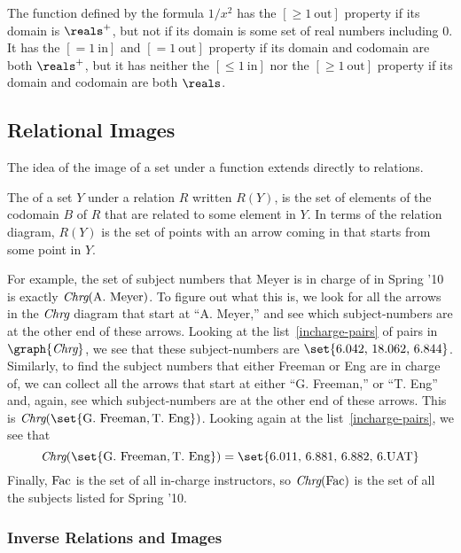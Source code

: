 \begin{example}
  The function defined by the formula $1/x^2$ has the $[\ge 1\
  \text{out}]$ property if its domain is $\reals^+$, but not if its domain
  is some set of real numbers including 0.  It has the $[=1\ \text{in}]$
  and $[=1\ \text{out}]$ property if its domain and codomain are both
  $\reals^+$, but it has neither the $[\le 1\ \text{in}]$ nor the $[\ge 1\
  \text{out}]$ property if its domain and codomain are both $\reals$.
\end{example}

\subsection{Relational Images}
The idea of the image of a set under a function extends directly to
relations.

\begin{definition}
  The %
 of a set $Y$ under a relation $R$ written $R(Y)$,
  is the set of elements of the codomain $B$ of $R$ that are related to
  some element in $Y$.  In terms of the relation diagram, $R(Y)$ is the
  set of points with an arrow coming in that starts from some point in $Y$.
\iffalse
, namely,
\[
R(Y) \eqdef \set{b \in B \suchthat yRb \text{ for some } y \in Y}.
\]\fi
\end{definition}

For example, the set of subject numbers that Meyer is in charge of in
Spring '10 is exactly $\textit{Chrg}(\text{A. Meyer})$.  To figure out what
this is, we look for all the arrows in the $\textit{Chrg}$ diagram that
start at ``A. Meyer,'' and see which subject-numbers are at the other
end of these arrows.  Looking at the list~\eqref{incharge-pairs} of
pairs in $\graph{\inchrg}$, we see that these subject-numbers are
$\set{\text{6.042, 18.062, 6.844}}$.  Similarly, to find the subject
numbers that either Freeman or Eng are in charge of, we can collect
all the arrows that start at either ``G. Freeman,'' or ``T. Eng'' and,
again, see which subject-numbers are at the other end of these arrows.
This is $\inchrg(\set{\text{G. Freeman}, \text{T. Eng}})$.  Looking
again at the list~\eqref{incharge-pairs}, we see that
\[
\inchrg(\set{\text{G. Freeman}, \text{T. Eng}}) = \set{\text{6.011, 6.881, 6.882, 6.UAT}}
\]
Finally, $\text{Fac}$ is the set of all in-charge instructors, so
$\textit{Chrg}(\text{Fac})$ is the set of all the subjects listed for Spring
'10.

\subsubsection{Inverse Relations and Images}

